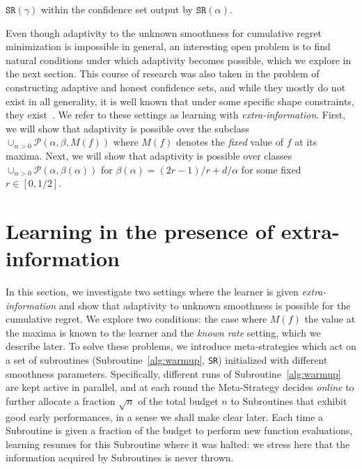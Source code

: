 \documentclass[final,12pt]{colt2018}
\begin{document}
$\texttt{SR}(\gamma)$ within the confidence set output by $\texttt{SR}(\alpha)$.

Even though adaptivity to the unknown smoothness for cumulative regret minimization is impossible in general, an interesting open problem is to find natural conditions under which adaptivity becomes possible, which we explore in the next section. This course of research was also taken in the problem of constructing adaptive and honest confidence sets, and while they mostly do not exist in all generality, it is well known that under some specific shape constraints, they exist~\cite{cai2013adaptive,bellec2016adaptive}. We refer to these settings as learning with \emph{extra-information}. First, we will show that adaptivity is possible over the subclass $\cup_{\alpha > 0} \mathcal P(\alpha, \beta, M(f))$ where $M(f)$ denotes the \emph{fixed} value of $f$ at its maxima. Next, we will show that adaptivity is possible over classes $\cup_{\alpha > 0} \mathcal P(\alpha, \beta(\alpha))$ for $\beta(\alpha) = (2r-1)/r + d/\alpha$ for some fixed $r \in [0,1/2]$.


\section{Learning in the presence of extra-information}\label{sec:info}
In this section, we investigate two settings where the learner is given \emph{extra-information} and show that adaptivity to unknown smoothness is possible for the cumulative regret. We explore two conditions: the case where $M(f)$ the value at the maxima is known to the learner and the \emph{known rate} setting, which we describe later. To solve these problems, we introduce meta-strategies which act on a set of subroutines (Subroutine~\ref{alg:warmup}, \texttt{SR}) initialized with different smoothness parameters. Specifically, different runs of Subroutine~\ref{alg:warmup} are kept active in parallel, and at each round the Meta-Strategy decides \emph{online} to further allocate a fraction $\sqrt{n}$ of the total budget $n$ to Subroutines that exhibit good early performances, in a sense we shall make clear later. Each time a Subroutine is given a fraction of the budget to perform new function evaluations, learning resumes for this Subroutine where it was halted: we stress here that the information acquired by Subroutines is never thrown.\\
\end{document}

